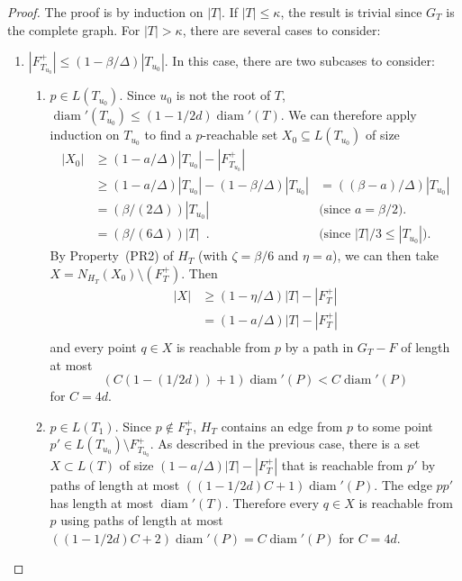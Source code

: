 \documentclass{patmorin}
\DeclareMathOperator{\diam}{diam}
\begin{document}
\begin{proof}
  The proof is by induction on $|T|$.  If $|T|\le\kappa$, the result is
  trivial since $G_T$ is the complete graph.  For $|T|>\kappa$, there
  are several cases to consider:
  \begin{enumerate}
    \item $|F^+_{T_{u_0}}|\le (1-\beta/\Delta)|T_{u_0}|$. In this case, there are two subcases
    to consider:
    \begin{enumerate}
      \item $p\in L(T_{u_0})$.  Since $u_0$ is not the root of $T$,
      $\diam'(T_{u_0}) \le (1-1/2d)\diam'(T)$.  We can therefore apply
      induction on $T_{u_0}$
       to find a $p$-reachable set $X_0\subseteq L(T_{u_0})$ of size
      \begin{align*}
        |X_0| & \ge (1-a/\Delta)|T_{u_0}|-|F^+_{T_{u_0}}| \\
              & \ge (1-a/\Delta)|T_{u_0}|-(1-\beta/\Delta)|T_{u_0}|
              & = ((\beta-a)/\Delta)|T_{u_0}| \\
              & = (\beta/(2\Delta))|T_{u_0}|
              & \text{(since $a = \beta/2$).} \\
              & = (\beta/(6\Delta))|T| \enspace .
              & \text{(since $|T|/3\le |T_{u_0}|$).} 
      \end{align*}
      By Property~(PR2) of $H_T$ (with $\zeta = \beta/6$ and $\eta =
      a$), we can then take $X=N_{H_T}(X_0)\setminus(F^+_T)$.  Then
      \begin{align*}
         |X| & \ge (1-\eta/\Delta)|T|-|F^+_T| \\
             & = (1-a/\Delta)|T|-|F^+_T| \\
      \end{align*} 
      and every point $q\in X$ is reachable from $p$ by a path in $G_T-F$
      of length at most
        \[ (C(1-(1/2d))+1)\diam'(P) < C\diam'(P) \]
      for $C= 4d$.

      \item $p\in L(T_1)$. Since $p\not\in F^+_T$, $H_T$ contains an edge
      from $p$ to some point $p'\in L(T_{u_0})\setminus F^+_{T_{u_0}}$.
      As described in the previous case, there is a set $X\subset L(T)$ of size
      $(1-a/\Delta)|T|-|F^+_{T}|$ that is reachable
      from $p'$ by paths of length at most $((1-1/2d)C+1)\diam'(P)$.
      The edge $pp'$ has length at most $\diam'(T)$. Therefore every $q\in X$ is
      reachable from $p$ using paths of length at most $((1-1/2d)C+2)\diam'(P)
      = C\diam'(P)$ for $C= 4d$.
    \end{enumerate}


\end{enumerate}
\end{proof}
\end{document}
